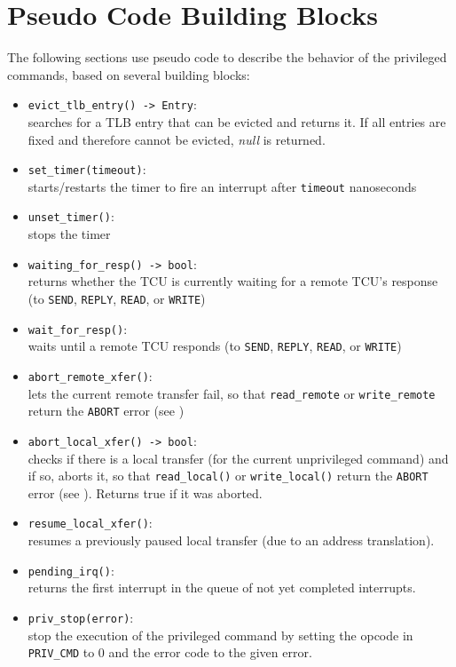 \section{Pseudo Code Building Blocks}

The following sections use pseudo code to describe the behavior of the privileged commands, based on
several building blocks:

\begin{itemize}
  \item \texttt{evict\_tlb\_entry() -> Entry}: \\
  searches for a TLB entry that can be evicted and returns it. If all entries are fixed and
  therefore cannot be evicted, \emph{null} is returned.\extend{}
  \item \texttt{set\_timer(timeout)}: \\
  starts/restarts the timer to fire an interrupt after \texttt{timeout} nanoseconds
  \item \texttt{unset\_timer()}:\\
  stops the timer
  \item \texttt{waiting\_for\_resp() -> bool}:\\
  returns whether the TCU is currently waiting for a remote TCU's response (to \texttt{SEND},
  \texttt{REPLY}, \texttt{READ}, or \texttt{WRITE})
  \item \texttt{wait\_for\_resp()}:\\
  waits until a remote TCU responds (to \texttt{SEND}, \texttt{REPLY}, \texttt{READ}, or
  \texttt{WRITE})
  \item \texttt{abort\_remote\_xfer()}:\\
  lets the current remote transfer fail, so that \texttt{read\_remote} or \texttt{write\_remote}
  return the \texttt{ABORT} error (see )
  \item \texttt{abort\_local\_xfer() -> bool}:\\
  checks if there is a local transfer (for the current unprivileged command) and if so, aborts it,
  so that \texttt{read\_local()} or \texttt{write\_local()} return the \texttt{ABORT} error (see
  ). Returns true if it was aborted.
  \item \texttt{resume\_local\_xfer()}:\\
  resumes a previously paused local transfer (due to an address translation).
  \item \texttt{pending\_irq()}:\\
  returns the first interrupt in the queue of not yet completed interrupts. \extend{}
  \item \texttt{priv\_stop(error)}: \\
  stop the execution of the privileged command by setting the opcode in \texttt{PRIV\_CMD} to 0 and
  the error code to the given error. \extend{}
\end{itemize}


